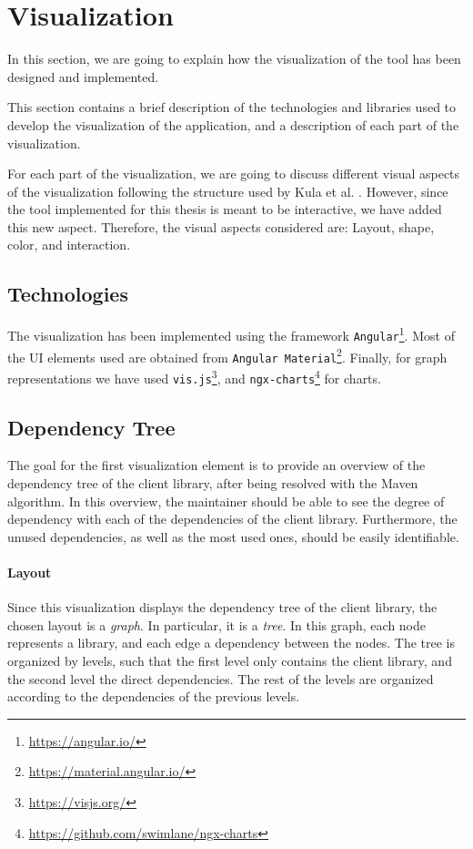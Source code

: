 \section{Visualization}
 In this section, we are going to explain how the visualization of the tool has been designed and implemented.

This section contains a brief description of the technologies and libraries used to develop the visualization of the application, and a description of each part of the visualization.

For each part of the visualization, we are going to discuss different visual aspects of the visualization following the structure used by Kula et al. \cite{kula2014visualizing}. However, since the tool implemented for this thesis is meant to be interactive, we have added this new aspect. Therefore, the visual aspects considered are: Layout, shape, color, and interaction.

\subsection{Technologies}
The visualization has been implemented using the framework \texttt{Angular}\footnote{\url{https://angular.io/}}. Most of the UI elements used are obtained from \texttt{Angular Material}\footnote{\url{https://material.angular.io/}}. Finally, for graph representations we have used \texttt{vis.js}\footnote{\url{https://visjs.org/}}, and \texttt{ngx-charts}\footnote{\url{https://github.com/swimlane/ngx-charts}} for charts.

\subsection{Dependency Tree}\label{sec:visualization-dependency-tree}
The goal for the first visualization element is to provide an overview of the dependency tree of the client library, after being resolved with the Maven algorithm. In this overview, the maintainer should be able to see the degree of dependency with each of the dependencies of the client library. Furthermore, the unused dependencies, as well as the most used ones, should be easily identifiable.

\paragraph{Layout}
Since this visualization displays the dependency tree of the client library, the chosen layout is a \textit{graph}. In particular, it is a \textit{tree}. In this graph, each node represents a library, and each edge a dependency between the nodes. The tree is organized by levels, such that the first level only contains the client library, and the second level the direct dependencies. The rest of the levels are organized according to the dependencies of the previous levels.

